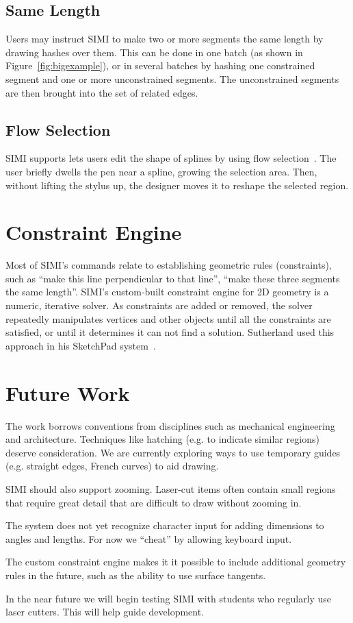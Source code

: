 \documentclass{chi-ext}
\begin{document}
\subsection{Same Length}

Users may instruct SIMI to make two or more segments the same length
by drawing hashes over them. This can be done in one batch (as shown
in Figure~\ref{fig:bigexample}), or in several batches by hashing
one constrained segment and one or more unconstrained segments. The
unconstrained segments are then brought into the set of related edges.

\subsection{Flow Selection}

SIMI supports lets users edit the shape of splines by using flow
selection~\cite{johnson-flow-selection}. The user briefly dwells the
pen near a spline, growing the selection area. Then, without lifting
the stylus up, the designer moves it to reshape the selected region.

\section{Constraint Engine}

Most of SIMI's commands relate to establishing geometric rules
(constraints), such as ``make this line perpendicular to that line'',
``make these three segments the same length''. SIMI's custom-built
constraint engine for 2D geometry is a numeric, iterative solver. As
constraints are added or removed, the solver repeatedly manipulates
vertices and other objects until all the constraints are satisfied, or
until it determines it can not find a solution. Sutherland used this
approach in his SketchPad system~\cite{sutherland-sketchpad}. 

\section{Future Work}

The work borrows conventions from disciplines such as mechanical
engineering and architecture. Techniques like hatching (e.g. to
indicate similar regions) deserve consideration. We are currently
exploring ways to use temporary guides (e.g. straight edges, French
curves) to aid drawing.

SIMI should also support zooming. Laser-cut items often contain small
regions that require great detail that are difficult to draw without
zooming in.

The system does not yet recognize character input for adding
dimensions to angles and lengths. For now we ``cheat'' by
allowing keyboard input. 

The custom constraint engine makes it it possible to include
additional geometry rules in the future, such as the ability to use
surface tangents.

In the near future we will begin testing SIMI with students who
regularly use laser cutters. This will help guide development.

\balance


\end{document}
